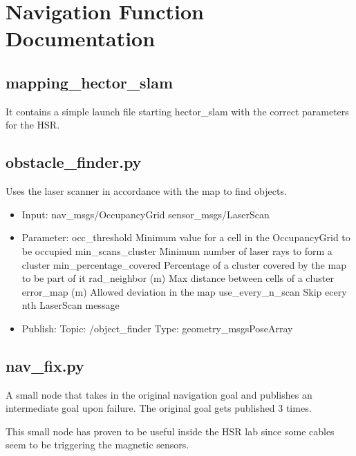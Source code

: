 \documentclass[main.tex]{subfiles}
\begin{document}
	\begingroup

	\renewcommand{\cleardoublepage}{}

	\renewcommand{\clearpage}{}

	\chapter{Navigation Function Documentation}

		
		\section{mapping\_hector\_slam}
		It contains a simple launch file starting hector\_slam with the correct parameters for the HSR.
		
		\section{obstacle\_finder.py}\label{met_obstacle_finder}
		Uses the laser scanner in accordance with the map to find objects.
		
		\begin{itemize}
			\item Input: 
				\subitem nav\_msgs/OccupancyGrid
				\subitem sensor\_msgs/LaserScan
			\item Parameter:
				\subitem occ\_threshold 
				Minimum value for a cell in the OccupancyGrid to be occupied
				\subitem min\_scans\_cluster
				Minimum number of laser rays to form a cluster
				\subitem min\_percentage\_covered
				Percentage of a cluster covered by the map to be part of it
				\subitem rad\_neighbor (m)
				Max distance between cells of a cluster
				\subitem error\_map (m)
				Allowed deviation in the map
				\subitem use\_every\_n\_scan
				Skip ecery nth LaserScan message 
			\item  Publish:
				\subitem Topic: /object\_finder
				\subitem Type: geometry\_msgsPoseArray
		\end{itemize}
		
		\section{nav\_fix.py}
		A small node that takes in the original navigation goal and publishes an intermediate goal upon failure. The original goal gets published 3 times.
		
		This small node has proven to be useful inside the HSR lab since some cables seem to be triggering the magnetic sensors.

	\endgroup
\end{document}
